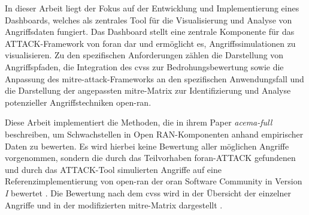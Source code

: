 \par
In dieser Arbeit liegt der Fokus auf der Entwicklung und Implementierung eines Dashboards, welches als zentrales Tool für die Visualisierung und Analyse von Angriffsdaten fungiert. Das Dashboard stellt eine zentrale Komponente für das ATTACK-Framework von \gls{foran} dar und ermöglicht es, Angriffssimulationen zu visualisieren. Zu den spezifischen Anforderungen zählen die Darstellung von Angriffspfaden, die Integration des \gls{cvss} zur Bedrohungsbewertung sowie die Anpassung des \gls{mitre}-\gls{attack}-Frameworks an den spezifischen Anwendungsfall und die Darstellung der angepassten \gls{mitre}-Matrix zur Identifizierung und Analyse potenzieller Angriffstechniken  \gls{open-ran}\autocite{dieterichDevelopmentAdversarySimulation}.


\par
Diese Arbeit implementiert die Methoden, die \citeauthor{klementSecuring6GTransition2024} in ihrem Paper \textit{\gls{acema-full}} beschreiben, um Schwachstellen in Open RAN-Komponenten anhand empirischer Daten zu bewerten. Es wird hierbei keine Bewertung aller möglichen Angriffe vorgenommen, sondern die durch das Teilvorhaben \gls{foran}-ATTACK gefundenen und durch das ATTACK-Tool simulierten Angriffe auf eine Referenzimplementierung von \gls{open-ran} der \gls{oran} Software Community in Version \textit{I} bewertet . Die Bewertung nach dem \gls{cvss} wird in der Übersicht der einzelner Angriffe und in der modifizierten \gls{mitre}-Matrix dargestellt \autocite{dieterichDevelopmentAdversarySimulation,klementSecuring6GTransition2024}.
